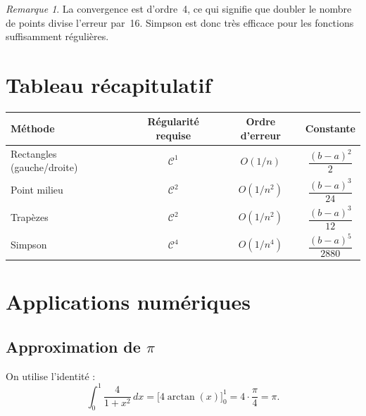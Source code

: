 \documentclass[a4paper,12pt]{article}
\theoremstyle{definition}
\theoremstyle{plain}
\theoremstyle{remark}
\newtheorem{remarque}{Remarque}[section]
\begin{document}
\begin{remarque}
La convergence est d'ordre~4, ce qui signifie que doubler le nombre de points divise l'erreur par~16. Simpson est donc très efficace pour les fonctions suffisamment régulières.
\end{remarque}

\section{Tableau récapitulatif}

\begin{center}
\renewcommand{\arraystretch}{1.4}
\begin{tabular}{@{}lccc@{}}
\toprule
\textbf{Méthode} & \textbf{Régularité requise} & \textbf{Ordre d'erreur} & \textbf{Constante} \\
\midrule
Rectangles (gauche/droite) & $\mathcal{C}^1$ & $O(1/n)$ & $\dfrac{(b-a)^2}{2}$ \\[6pt]
Point milieu & $\mathcal{C}^2$ & $O(1/n^2)$ & $\dfrac{(b-a)^3}{24}$ \\[6pt]
Trapèzes & $\mathcal{C}^2$ & $O(1/n^2)$ & $\dfrac{(b-a)^3}{12}$ \\[6pt]
Simpson & $\mathcal{C}^4$ & $O(1/n^4)$ & $\dfrac{(b-a)^5}{2880}$ \\[4pt]
\bottomrule
\end{tabular}
\end{center}

\section{Applications numériques}

\subsection{Approximation de $\pi$}

On utilise l'identité :
\[
  \int_0^1 \frac{4}{1+x^2}\,dx = \big[4\arctan(x)\big]_0^1 = 4\cdot\frac{\pi}{4} = \pi.
\]
\end{document}

